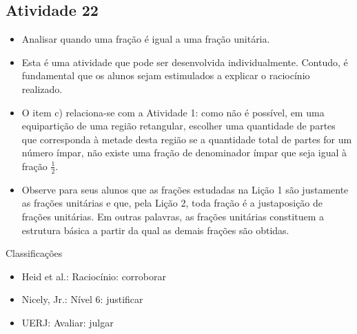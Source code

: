 \begin{multicols}{2}
\subsection{Atividade 22}

\begin{itemize} %
    \item       Analisar quando uma fração é igual a uma fração unitária.
\end{itemize} %
  
  
 
\begin{itemize} %
    \item       Esta é uma atividade que pode ser desenvolvida individualmente. 
Contudo, é fundamental que os alunos sejam estimulados a explicar o raciocínio 
realizado.
    \item       O item c) relaciona-se com a Atividade 1: como não é possível, 
em uma equipartição de uma região retangular, escolher uma quantidade de partes 
que corresponda à metade desta região se a quantidade total de partes for um 
número ímpar, não existe uma fração de denominador ímpar que seja igual à fração 
      $\frac{1}{2}$.
    \item       Observe para seus alunos que as frações estudadas na Lição 1 são 
justamente as frações unitárias e que, pela Lição 2, toda fração é a 
justaposição de frações unitárias. Em outras palavras, as frações unitárias 
constituem a estrutura básica a partir da qual as demais frações são obtidas.
\end{itemize} %
  
  
  Classificações  
\begin{itemize} %
    \item       Heid et al.: Raciocínio: corroborar
    \item       Nicely, Jr.: Nível 6: justificar
    \item       UERJ: Avaliar: julgar
\end{itemize} %
  

\end{multicols}
